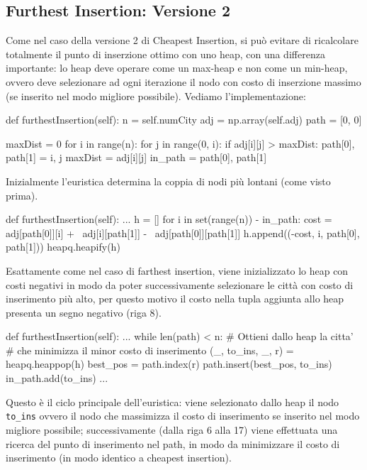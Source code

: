 \documentclass[a4paper,12pt]{report}
\begin{document}
\subsection{Furthest Insertion: Versione 2}
Come nel caso della versione 2 di Cheapest Insertion, si può evitare di ricalcolare totalmente il punto di inserzione ottimo con uno heap, con una differenza importante: lo heap deve operare come un max-heap e non come un min-heap, ovvero deve selezionare ad ogni iterazione il nodo con costo di inserzione massimo (se inserito nel modo migliore possibile). Vediamo l'implementazione:
\begin{python}
def furthestInsertion(self):
  n = self.numCity
  adj = np.array(self.adj)
  path = [0, 0]

  maxDist = 0
  for i in range(n):
      for j in range(0, i):
          if adj[i][j] > maxDist:
              path[0], path[1] = i, j
              maxDist = adj[i][j]
  in_path = {path[0], path[1]}
\end{python}
Inizialmente l'euristica determina la coppia di nodi più lontani (come visto prima).
\begin{python}
def furthestInsertion(self):
  ...
  h = []
  for i in set(range(n)) - in_path:
    cost = adj[path[0]][i] + \
           adj[i][path[1]] - \
           adj[path[0]][path[1]]
    h.append((-cost, i, path[0], path[1]))
  heapq.heapify(h)
\end{python}
Esattamente come nel caso di farthest insertion, viene inizializzato lo heap con costi negativi in modo da poter successivamente selezionare le città con costo di inserimento più alto, per questo motivo il costo nella tupla aggiunta allo heap presenta un segno negativo (riga 8).
\begin{python}
def furthestInsertion(self):
  ...
  while len(path) < n:
    # Ottieni dallo heap la citta' 
    # che minimizza il minor costo di inserimento
    (_, to_ins, _, r) = heapq.heappop(h)
    best_pos = path.index(r)
    path.insert(best_pos, to_ins)
    in_path.add(to_ins)
    ...
\end{python}
Questo è il ciclo principale dell'euristica: viene selezionato dallo heap il nodo \lstinline!to_ins! ovvero il nodo che massimizza il costo di inserimento se inserito nel modo migliore possibile; successivamente (dalla riga 6 alla 17) viene effettuata una ricerca del punto di inserimento nel path, in modo da minimizzare il costo di inserimento (in modo identico a cheapest insertion).
\end{document}
